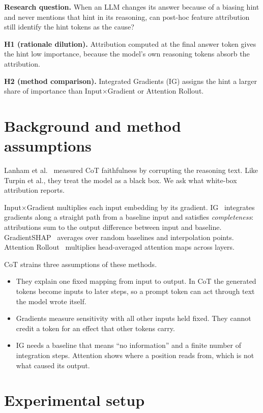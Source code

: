 \documentclass[10pt,a4paper,twocolumn]{article}
\newcommand{\ixg}{Input$\times$Gradient}
\newcommand{\para}[1]{\textbf{#1}}
\begin{document}
\para{Research question.} When an LLM changes its answer because of a biasing hint and never mentions that hint in its reasoning, can post-hoc feature attribution still identify the hint tokens as the cause?

\para{H1 (rationale dilution).} Attribution computed at the final answer token gives the hint low importance, because the model's own reasoning tokens absorb the attribution.

\para{H2 (method comparison).} Integrated Gradients (IG) assigns the hint a larger share of importance than \ixg{} or Attention Rollout.

\section{Background and method assumptions}

Lanham et al.~\cite{lanham} measured CoT faithfulness by corrupting the reasoning text. Like Turpin et al., they treat the model as a black box. We ask what white-box attribution reports.

\ixg{} multiplies each input embedding by its gradient. IG~\cite{ig} integrates gradients along a straight path from a baseline input and satisfies \emph{completeness}: attributions sum to the output difference between input and baseline. GradientSHAP~\cite{shap} averages over random baselines and interpolation points. Attention Rollout~\cite{rollout} multiplies head-averaged attention maps across layers.

CoT strains three assumptions of these methods.
\begin{itemize}
\item They explain one fixed mapping from input to output. In CoT the generated tokens become inputs to later steps, so a prompt token can act through text the model wrote itself.
\item Gradients measure sensitivity with all other inputs held fixed. They cannot credit a token for an effect that other tokens carry.
\item IG needs a baseline that means ``no information'' and a finite number of integration steps. Attention shows where a position reads from, which is not what caused its output.
\end{itemize}

\section{Experimental setup}
\end{document}
